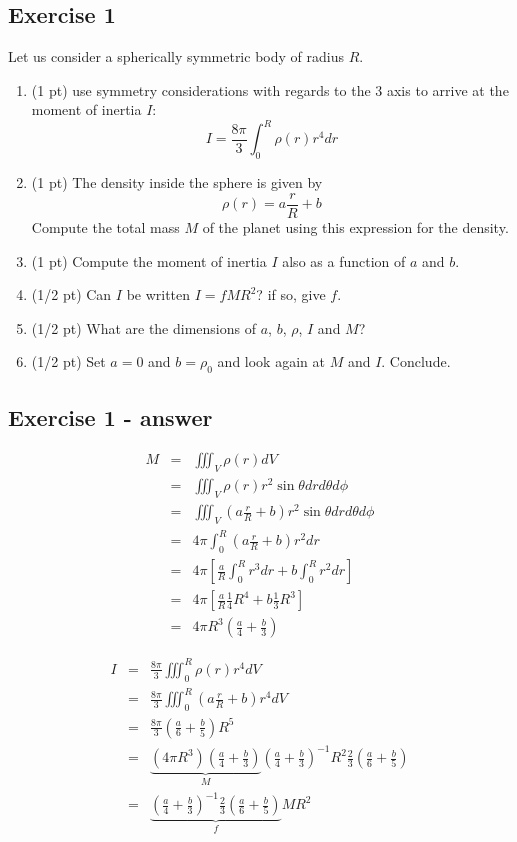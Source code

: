 
\subsection*{Exercise 1}


Let us consider a spherically symmetric body of radius $R$.

\begin{enumerate}
\item (1 pt) use symmetry considerations with regards to the 3 axis
to arrive at the moment of inertia $I$:
\begin{equation}
I=\frac{8\pi}{3} \int_0^R \rho(r) r^4 dr 
\end{equation}
\item (1 pt) The density inside the sphere is given by
\[
\rho(r)=a \frac{r}{R} +b
\]
Compute the total mass $M$ of the planet using this expression for the density.
\item (1 pt) Compute the moment of inertia $I$ also as a function of $a$ and $b$.
\item (1/2 pt) Can $I$ be written $I=fMR^2$? if so, give $f$.
\item (1/2 pt) What are the dimensions of $a$, $b$, $\rho$, $I$ and $M$?
\item (1/2 pt) Set $a=0$ and $b=\rho_0$ and look again at $M$ and $I$. Conclude.
\end{enumerate}

\subsection*{Exercise 1 - answer}


\begin{eqnarray}
M
&=& \iiint_V \rho(r) dV \\
&=& \iiint_V \rho(r) r^2 \sin\theta dr d\theta d\phi \\
&=& \iiint_V (a\frac{r}{R}+b) r^2 \sin\theta dr d\theta d\phi \\
&=& 4\pi \int_0^R (a\frac{r}{R}+b) r^2 dr \\
&=& 4\pi \left[ \frac{a}{R} \int_0^R r^3 dr +b\int_0^R  r^2 dr \right]\\
&=& 4\pi \left[ \frac{a}{R} \frac14 R^4  + b\frac13 R^3 \right]\\
&=& 4 \pi R^3 \left( \frac{a}{4} + \frac{b}{3} \right)
\end{eqnarray}

\begin{eqnarray}
I
&=& \frac{8\pi}{3} \iiint_0^R \rho(r) r^4 dV \\
&=& \frac{8\pi}{3} \iiint_0^R (a\frac{r}{R}+b) r^4 dV \\
&=& \frac{8\pi}{3} \left( \frac{a}{6} + \frac{b}{5} \right) R^5 \\\
&=& \underbrace{(4 \pi R^3 ) \left( \frac{a}{4} + \frac{b}{3} \right)}_{M}
\left( \frac{a}{4} + \frac{b}{3} \right)^{-1} 
R^2  \frac23\left( \frac{a}{6} + \frac{b}{5} \right) \\
&=& \underbrace{\left( \frac{a}{4} + \frac{b}{3} \right)^{-1}
\frac23 \left( \frac{a}{6} + \frac{b}{5} \right)}_{f} M R^2
\end{eqnarray}

